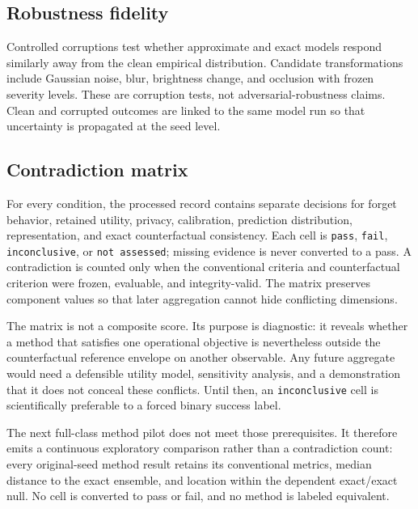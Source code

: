 \subsection{Robustness fidelity}
Controlled corruptions test whether approximate and exact models respond similarly away
from the clean empirical distribution.  Candidate transformations include Gaussian noise,
blur, brightness change, and occlusion with frozen severity levels.  These are corruption
tests, not adversarial-robustness claims.  Clean and corrupted outcomes are linked to the
same model run so that uncertainty is propagated at the seed level.

\subsection{Contradiction matrix}
For every condition, the processed record contains separate decisions for forget behavior,
retained utility, privacy, calibration, prediction distribution, representation, and exact
counterfactual consistency.  Each cell is \texttt{pass}, \texttt{fail},
\texttt{inconclusive}, or \texttt{not assessed}; missing evidence is never converted to a
pass.  A contradiction is counted only when the conventional criteria and counterfactual
criterion were frozen, evaluable, and integrity-valid.  The matrix preserves component
values so that later aggregation cannot hide conflicting dimensions.

The matrix is not a composite score. Its purpose is diagnostic: it reveals whether a method
that satisfies one operational objective is nevertheless outside the counterfactual
reference envelope on another observable. Any future aggregate would need a defensible
utility model, sensitivity analysis, and a demonstration that it does not conceal these
conflicts. Until then, an \texttt{inconclusive} cell is scientifically preferable to a
forced binary success label.

The next full-class method pilot does not meet those prerequisites. It therefore emits a
continuous exploratory comparison rather than a contradiction count: every original-seed
method result retains its conventional metrics, median distance to the exact ensemble, and
location within the dependent exact/exact null. No cell is converted to pass or fail, and no
method is labeled equivalent.
